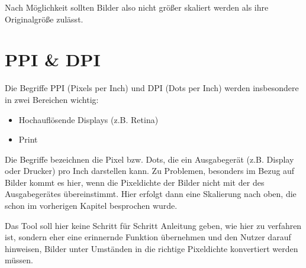 Nach Möglichkeit sollten Bilder also nicht größer skaliert werden als ihre Originalgröße zulässt.


\section{PPI \& DPI}
Die Begriffe PPI (Pixels per Inch) und DPI (Dots per Inch) werden insbesondere in zwei Bereichen wichtig:
\begin{itemize}
	\item Hochauflösende Displays (z.B. Retina)
	\item Print
\end{itemize}

Die Begriffe bezeichnen die Pixel bzw. Dots, die ein Ausgabegerät (z.B. Display oder Drucker) pro Inch darstellen kann. Zu Problemen, besonders im Bezug auf Bilder kommt es hier, wenn die Pixeldichte der Bilder nicht mit der des Ausgabegerätes übereinstimmt. Hier erfolgt dann eine Skalierung nach oben, die schon im vorherigen Kapitel besprochen wurde.

Das Tool soll hier keine Schritt für Schritt Anleitung geben, wie hier zu verfahren ist, sondern eher eine erinnernde Funktion übernehmen und den Nutzer darauf hinweisen, Bilder unter Umständen in die richtige Pixeldichte konvertiert werden müssen.
